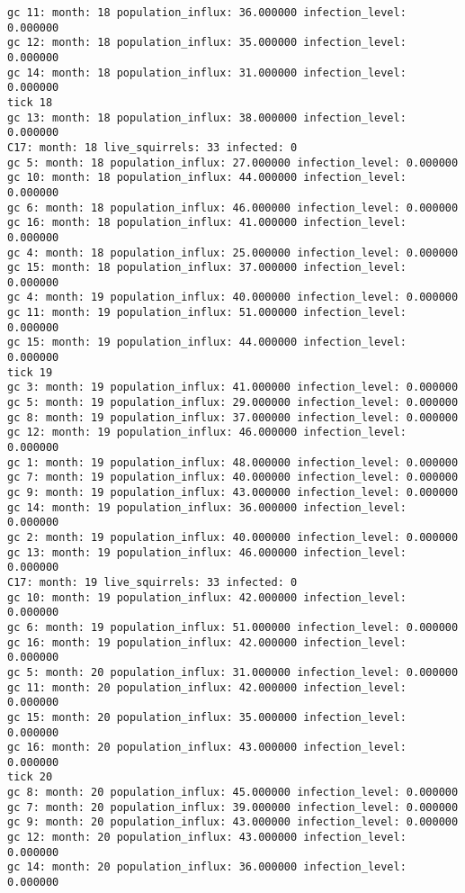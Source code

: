 \begin{lstlisting}[basicstyle=\tiny]
gc 11: month: 18 population_influx: 36.000000 infection_level: 0.000000
gc 12: month: 18 population_influx: 35.000000 infection_level: 0.000000
gc 14: month: 18 population_influx: 31.000000 infection_level: 0.000000
tick 18
gc 13: month: 18 population_influx: 38.000000 infection_level: 0.000000
C17: month: 18 live_squirrels: 33 infected: 0
gc 5: month: 18 population_influx: 27.000000 infection_level: 0.000000
gc 10: month: 18 population_influx: 44.000000 infection_level: 0.000000
gc 6: month: 18 population_influx: 46.000000 infection_level: 0.000000
gc 16: month: 18 population_influx: 41.000000 infection_level: 0.000000
gc 4: month: 18 population_influx: 25.000000 infection_level: 0.000000
gc 15: month: 18 population_influx: 37.000000 infection_level: 0.000000
gc 4: month: 19 population_influx: 40.000000 infection_level: 0.000000
gc 11: month: 19 population_influx: 51.000000 infection_level: 0.000000
gc 15: month: 19 population_influx: 44.000000 infection_level: 0.000000
tick 19
gc 3: month: 19 population_influx: 41.000000 infection_level: 0.000000
gc 5: month: 19 population_influx: 29.000000 infection_level: 0.000000
gc 8: month: 19 population_influx: 37.000000 infection_level: 0.000000
gc 12: month: 19 population_influx: 46.000000 infection_level: 0.000000
gc 1: month: 19 population_influx: 48.000000 infection_level: 0.000000
gc 7: month: 19 population_influx: 40.000000 infection_level: 0.000000
gc 9: month: 19 population_influx: 43.000000 infection_level: 0.000000
gc 14: month: 19 population_influx: 36.000000 infection_level: 0.000000
gc 2: month: 19 population_influx: 40.000000 infection_level: 0.000000
gc 13: month: 19 population_influx: 46.000000 infection_level: 0.000000
C17: month: 19 live_squirrels: 33 infected: 0
gc 10: month: 19 population_influx: 42.000000 infection_level: 0.000000
gc 6: month: 19 population_influx: 51.000000 infection_level: 0.000000
gc 16: month: 19 population_influx: 42.000000 infection_level: 0.000000
gc 5: month: 20 population_influx: 31.000000 infection_level: 0.000000
gc 11: month: 20 population_influx: 42.000000 infection_level: 0.000000
gc 15: month: 20 population_influx: 35.000000 infection_level: 0.000000
gc 16: month: 20 population_influx: 43.000000 infection_level: 0.000000
tick 20
gc 8: month: 20 population_influx: 45.000000 infection_level: 0.000000
gc 7: month: 20 population_influx: 39.000000 infection_level: 0.000000
gc 9: month: 20 population_influx: 43.000000 infection_level: 0.000000
gc 12: month: 20 population_influx: 43.000000 infection_level: 0.000000
gc 14: month: 20 population_influx: 36.000000 infection_level: 0.000000

\end{lstlisting}
